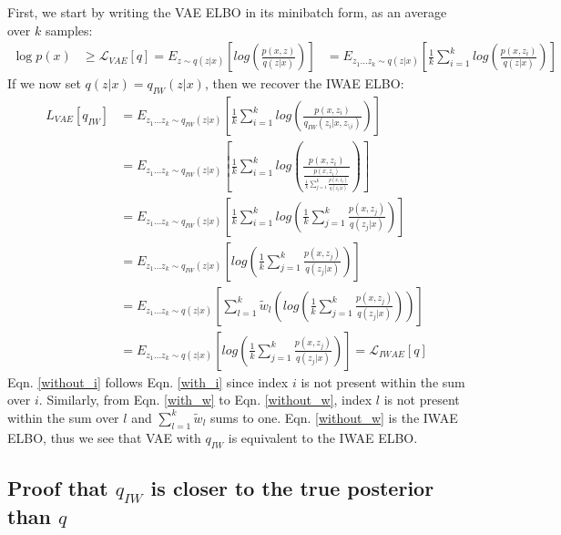 \documentclass{article} %
\begin{document}
First, we start by writing the VAE ELBO in its minibatch form, as an average over $k$ samples:
\begin{align} 
    \log p(x) &\geq 
    \mathcal{L}_{VAE}[q] =
    E_{z \sim q(z|x)} \left[  log\left(\frac{p(x,z)}{q(z|x)} \right) \right]  
    &= E_{z_{1}...z_{k} \sim q(z|x)} \left[  \frac{1}{k}\sum_{i=1}^k log\left(\frac{p(x,z_i)}{q(z|x)} \right) \right]
\end{align}
If we now set $q(z|x) = q_{IW}(z|x)$, then we recover the IWAE ELBO:
\begin{align}
    L_{VAE}[q_{IW}] &= E_{z_{1}...z_{k} \sim q_{IW}(z|x)} \left[  \frac{1}{k}\sum_{i=1}^k log\left(\frac{p(x,z_i)}{q_{IW}(z_i|x,z_{\setminus i})}  \right)  \right] \\
    &= E_{z_{1}...z_{k} \sim q_{IW}(z|x)} \left[  \frac{1}{k}\sum_{i=1}^k log\left(\frac{p(x,z_i)}{\frac{p(x,z_i)}{\frac{1}{k}   \sum_{j=1}^k \frac{p(x,z_j)}{q(z_j|x)}}}  \right)  \right] \\
    &= E_{z_{1}...z_{k} \sim q_{IW}(z|x)} \left[  \frac{1}{k}\sum_{i=1}^k log\left(\frac{1}{k} \sum_{j=1}^k \frac{p(x,z_j)}{q(z_j|x)}\right)  \right] \label{with_i} \\
    &= E_{z_{1}...z_{k} \sim q_{IW}(z|x)} \left[ log\left(\frac{1}{k} \sum_{j=1}^k \frac{p(x,z_j)}{q(z_j|x)}\right)  \right]  \label{without_i} \\
    &= E_{z_{1}...z_{k} \sim q(z|x)} \left[  \sum_{l=1}^k \tilde w_l  \left( log\left(\frac{1}{k} \sum_{j=1}^k \frac{p(x,z_j)}{q(z_j|x)}\right)\right)  \right] \label{with_w} \\ 
    &= E_{z_{1}...z_{k} \sim q(z|x)} \left[  log\left(\frac{1}{k}\sum_{j=1}^k \frac{p(x,z_j)}{q(z_j|x)}  \right)  \right] = \mathcal{L}_{IWAE}[q] \label{without_w}
\end{align}
Eqn. \ref{without_i} follows Eqn. \ref{with_i} since index $i$ is not present within the sum over $i$. Similarly, from Eqn. \ref{with_w} to Eqn. \ref{without_w}, index $l$ is not present within the sum over $l$ and $\sum_{l=1}^k \tilde w_l$ sums to one. Eqn. \ref{without_w} is the IWAE ELBO, thus we see that VAE with $q_{IW}$ is equivalent to the IWAE ELBO.















\subsection{Proof that \texorpdfstring{$q_{IW}$}{} is closer to the true posterior than \texorpdfstring{$q$}{}}
\end{document}
